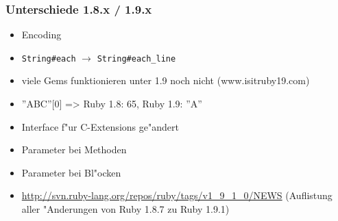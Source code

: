\documentclass{beamer}
\begin{document}
\lstset{language=Ruby}
\lstset{basicstyle=\small,numbers=none, numberstyle=\tiny, numbersep=5pt}
\begin{frame}
 \frametitle{Unterschiede 1.8.x / 1.9.x}
 \begin{itemize}[<+->]
   \item Encoding
   \item \texttt{String\#each} $\rightarrow$
         \texttt{String\#each\_line}
   \item viele Gems funktionieren unter 1.9 noch nicht (www.isitruby19.com)
   \item ''ABC''[0] => Ruby 1.8: 65, Ruby 1.9: ''A''
   \item Interface f"ur C-Extensions ge"andert
   \item Parameter bei Methoden
   \item Parameter bei Bl"ocken
   \item \href{http://svn.ruby-lang.org/repos/ruby/tags/v1\_9\_1\_0/NEWS}{http://svn.ruby-lang.org/repos/ruby/tags/v1\_9\_1\_0/NEWS} (Auflistung aller "Anderungen von Ruby 1.8.7 zu Ruby 1.9.1)
 \end{itemize}
\end{frame}

\end{document}
